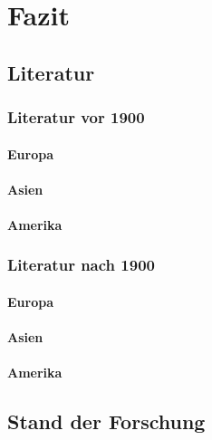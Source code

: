 
\chapter{Fazit}

\section{Literatur}
\subsection{Literatur vor 1900}


\subsubsection{Europa}

\blindtext 

\blindtext

\blindtext

\subsubsection{Asien}

\blindtext 

\blindtext

\blindtext

\subsubsection{Amerika}

\blindtext 

\blindtext

\blindtext

\subsection{Literatur nach 1900}

\subsubsection{Europa}

\blindtext 

\blindtext

\blindtext

\subsubsection{Asien}

\blindtext 

\blindtext

\blindtext

\subsubsection{Amerika}

\blindtext[3]

\blindtext[3]

\blindtext[3]


\section{Stand der Forschung}

\blindtext [100]

\blindtext

\blindtext